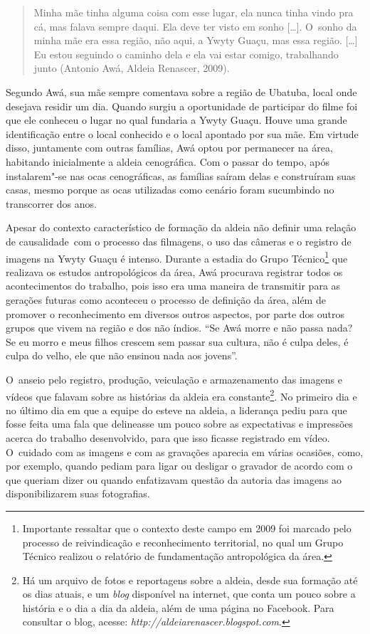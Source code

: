 \begin{quote}
\noindent
Minha mãe tinha alguma coisa com esse lugar, ela nunca tinha vindo pra
cá, mas falava sempre daqui. Ela deve ter visto em sonho [\ldots{}]. O~sonho
da minha mãe era essa região, não aqui, a Ywyty Guaçu, mas essa região.
[\ldots{}] Eu estou seguindo o caminho dela e ela vai estar comigo,
trabalhando junto (Antonio Awá, Aldeia Renascer, 2009).
\end{quote}

Segundo Awá, sua mãe sempre comentava sobre a região de Ubatuba, local
onde desejava residir um dia. Quando surgiu a oportunidade de
participar do filme foi que ele conheceu o lugar no qual fundaria a
Ywyty Guaçu. Houve uma grande identificação entre o local conhecido e o
local apontado por sua mãe. Em virtude disso, juntamente com outras
famílias, Awá optou por permanecer na área, habitando inicialmente a
aldeia cenográfica. Com o passar do tempo, após instalarem"-se nas ocas
cenográficas, as famílias saíram delas e construíram suas casas, mesmo
porque as ocas utilizadas como cenário foram sucumbindo no transcorrer
dos anos. 

Apesar do contexto característico de formação da aldeia não definir uma
relação de causalidade~com o processo das filmagens, o uso das câmeras
e o registro de imagens na Ywyty Guaçu é intenso. Durante a estadia do
Grupo Técnico\footnote{Importante ressaltar que o contexto deste campo
em 2009 foi marcado pelo processo de reivindicação e reconhecimento
territorial, no qual um Grupo Técnico realizou o relatório de
fundamentação antropológica da área.} que realizava os estudos
antropológicos da área, Awá procurava registrar todos os acontecimentos
do trabalho, pois isso era uma maneira de transmitir para as gerações
futuras como aconteceu o processo de definição da área, além de
promover o reconhecimento em diversos outros aspectos, por parte dos
outros grupos que vivem na região e dos não índios. ``Se Awá morre e não
passa nada? Se eu morro e meus filhos crescem sem passar sua cultura,
não é culpa deles, é culpa do velho, ele que não ensinou nada aos
jovens''. 

O~anseio pelo registro, produção, veiculação e armazenamento das imagens
e vídeos que falavam sobre as histórias da aldeia era
constante\footnote{Há um arquivo de fotos e reportagens sobre a
aldeia, desde sua formação até os dias atuais, e um \emph{blog} disponível na
internet, que conta um pouco sobre a história e o dia a dia da aldeia,
além de uma página no Facebook. Para consultar o blog, acesse:
\emph{http://aldeiarenascer.blogspot.com}.}. No
primeiro dia e no último dia em que a equipe do  esteve na aldeia, a
liderança pediu para que fosse feita uma fala que delineasse um pouco
sobre as expectativas e impressões acerca do trabalho desenvolvido,
para que isso ficasse registrado em vídeo. O~cuidado com as imagens e
com as gravações aparecia em várias ocasiões, como, por exemplo, quando
pediam para ligar ou desligar o gravador de acordo com o que queriam
dizer ou quando enfatizavam questão da autoria das imagens ao
disponibilizarem suas fotografias.

